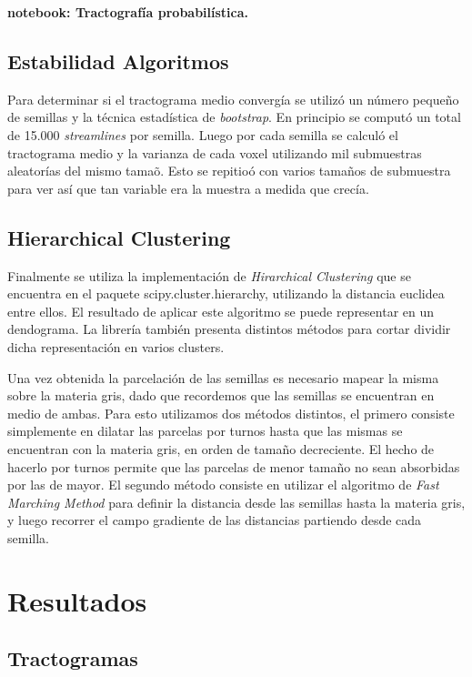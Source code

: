 \textbf{notebook: Tractograf\'ia probabil\'istica.}

\subsection{Estabilidad Algoritmos}

Para determinar si el tractograma medio converg\'ia se utiliz\'o un n\'umero 
peque\~no de semillas y la t\'ecnica  estad\'istica de \textit{bootstrap}.
En principio se comput\'o un total de 15.000 \textit{streamlines} por semilla.
Luego por cada semilla se calcul\'o el tractograma medio y la varianza de 
cada voxel utilizando mil submuestras aleator\'ias del mismo tama\~o. Esto se
repitio\'o con varios tama\~nos de submuestra para ver as\'i que tan variable
era la muestra a medida que crec\'ia.

\subsection{Hierarchical Clustering}

Finalmente se utiliza la implementaci\'on de \textit{Hirarchical Clustering} 
que se encuentra en el paquete scipy.cluster.hierarchy, utilizando la distancia
euclidea entre ellos. El resultado de aplicar este algoritmo se puede representar
en un dendograma. La librer\'ia tambi\'en presenta distintos m\'etodos para 
cortar dividir dicha representaci\'on en varios clusters. 

Una vez obtenida la parcelaci\'on de las semillas es necesario mapear la misma
sobre la materia gris, dado que recordemos que las semillas se encuentran 
en medio de ambas. Para esto utilizamos dos m\'etodos distintos, el primero 
consiste simplemente en dilatar las parcelas por turnos hasta que las mismas se
encuentran con la materia gris, en orden de tama\~no decreciente. El hecho de
hacerlo por turnos permite que las parcelas de menor tama\~no no sean absorbidas
por las de mayor. El segundo m\'etodo consiste en utilizar el algoritmo de 
\textit{Fast Marching Method} para definir la distancia desde las semillas hasta
la materia gris, y luego recorrer el campo gradiente de las distancias partiendo
desde cada semilla.

\section{Resultados}

\subsection{Tractogramas}

